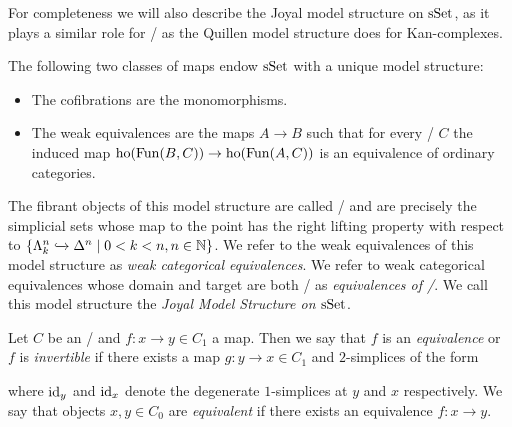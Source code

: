 For completeness we will also describe the Joyal model structure on $\operatorname{sSet}$, as it plays a similar role for \inftycats/ as the Quillen model structure does for Kan-complexes.
\begin{thm}
    The following two classes of maps endow $\operatorname{sSet}$ with a unique model structure:
    \begin{itemize}
        \item The cofibrations are the monomorphisms.
        \item The weak equivalences are the maps $A\to B$ such that for every \inftycat/ $C$ the induced map $\operatorname{ho}(\operatorname{Fun}(B,C))\to\operatorname{ho}(\operatorname{Fun}(A,C))$ is an equivalence of ordinary categories.
    \end{itemize}
    The fibrant objects of this model structure are called \inftycats/ and are precisely the simplicial sets whose map to the point has the right lifting property with respect to $\left\lbrace\Lambda_k^n\xhookrightarrow{}\Delta^n\mid 0< k< n, n\in\mathbb{N}\right\rbrace$.
    We refer to the weak equivalences of this model structure as \emph{weak categorical equivalences}.
    We refer to weak categorical equivalences whose domain and target are both \inftycats/ as \emph{equivalences of \inftycats/}.
    We call this model structure the \emph{Joyal Model Structure on $\operatorname{sSet}$}.
    \begin{reference}
        \cite[Definition 3.3.7, Theorem 3.6.8 and Theorem 3.6.1]{cisinski_2019}
    \end{reference}
\end{thm}
\begin{definition}
    Let $C$ be an \inftycat/ and $f\colon x\to y\in C_1$ a map.
    Then we say that $f$ is an \emph{equivalence} or $f$ is \emph{invertible} if there exists a map $g\colon y\to x\in C_1$ and $2$-simplices of the form
    \begin{center}
    \end{center}
    where $\text{id}_y$ and $\text{id}_x$ denote the degenerate $1$-simplices at $y$ and $x$ respectively.
    We say that objects $x,y\in C_0$ are \emph{equivalent} if there exists an equivalence $f\colon x\to y$.
\end{definition}

